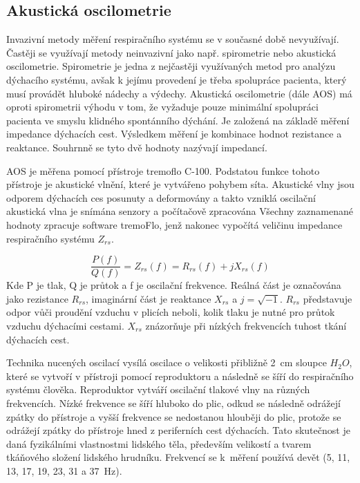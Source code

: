  \label{kap-metody}
\subsection {Akustická oscilometrie}
Invazivní metody měření respiračního systému se v současné době nevyužívají. Častěji se využívají metody neinvazivní jako např. spirometrie nebo akustická oscilometrie. Spirometrie je jedna z nejčastěji využívaných metod pro analýzu dýchacího systému, avšak k jejímu provedení je třeba spolupráce pacienta, který musí provádět hluboké nádechy a výdechy.
Akustická oscilometrie (dále AOS) má oproti spirometrii výhodu v tom, že vyžaduje pouze minimální spolupráci pacienta ve smyslu klidného spontánního dýchání. 
Je založená na základě měření impedance dýchacích cest. Výsledkem měření je kombinace hodnot rezistance a reaktance. Souhrnně se tyto dvě hodnoty nazývají impedancí. 

AOS je měřena pomocí přístroje tremoflo C-100. Podstatou funkce tohoto přístroje je akustické vlnění, které je vytvářeno pohybem síta. Akustické vlny jsou odporem dýchacích ces posunuty a deformovány a takto vzniklá oscilační akustická vlna je snímána senzory a počítačově zpracována
 Všechny zaznamenané hodnoty zpracuje software tremoFlo, jenž nakonec vypočítá veličinu impedance respiračního systému $Z_{rs}$. 

\begin{equation}
 \label{rce:1}
  \frac{P(f)}{Q(f)} = Z_{rs}(f) = R_{rs}(f) + j X_{rs}(f) 
\end{equation}
Kde P je tlak, Q je průtok a f je oscilační frekvence. 
Reálná část je označována jako rezistance $R_{rs}$, imaginární část je reaktance $X_{rs}$ a $j = \sqrt{-1}$. 
$R_{rs}$ představuje odpor vůči proudění vzduchu v plicích neboli, kolik tlaku je nutné pro průtok vzduchu dýchacími cestami. $X_{rs}$ znázorňuje při nízkých frekvencích tuhost tkání dýchacích cest. 


Technika nucených oscilací vysílá oscilace o velikosti přibližně \SI{2}{cm} sloupce $H_{2}O$, které se vytvoří v přístroji pomocí reproduktoru a následně se šíří do respiračního systému člověka. Reproduktor vytváří oscilační tlakové vlny na různých frekvencích. Nízké frekvence se šíří hluboko do plic, odkud se následně odrážejí zpátky do přístroje a vyšší frekvence se nedostanou hlouběji do plic, protože se  odrážejí zpátky do přístroje hned z periferních cest dýchacích. Tato skutečnost je daná fyzikálními vlastnostmi lidského těla, především velikostí a tvarem tkáňového složení lidského hrudníku. \cite{Vlcek2018} Frekvencí se k~měření používá devět (5, 11, 13, 17, 19, 23, 31 a  \SI{37}{Hz}). 

